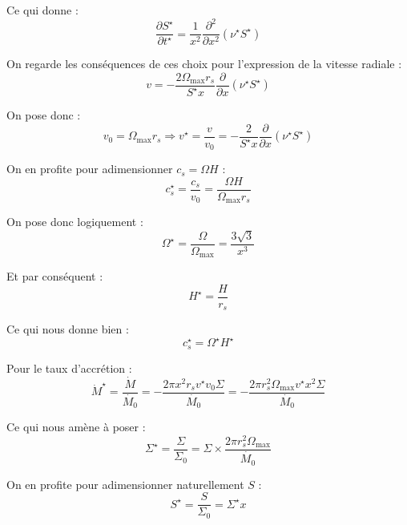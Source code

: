 Ce qui donne :
\begin{equation}
    \frac{\partial S^\star}{\partial t^\star} = \frac{1}{x^2} \frac{\partial^2}{\partial x^2} \left(\nu^\star S^\star\right)
\end{equation}

On regarde les conséquences de ces choix pour l’expression de la vitesse radiale :
\begin{equation}
    v = - \frac{2 \Omega_\mathrm{max} r_s}{S^\star x} \frac{\partial}{\partial x} \left(\nu^\star S^\star\right)
\end{equation}

On pose donc :
\begin{equation}
    v_0 = \Omega_\mathrm{max} r_s \Rightarrow v^\star = \frac{v}{v_0} = - \frac{2}{S^\star x} \frac{\partial}{\partial x} \left(\nu^\star S^\star\right)
\end{equation}

On en profite pour adimensionner $c_s = \Omega H$ :
\begin{equation}
    c_s^\star = \frac{c_s}{v_0} = \frac{\Omega H}{\Omega_\mathrm{max} r_s}
\end{equation}

On pose donc logiquement :
\begin{equation}
    \Omega^\star = \frac{\Omega}{\Omega_\mathrm{max}} = \frac{3\sqrt{3}}{x^3}
\end{equation}

Et par conséquent :
\begin{equation}
    H^\star = \frac{H}{r_s}
\end{equation}

Ce qui nous donne bien :
\begin{equation}
    c_s^\star = \Omega^\star H^\star
\end{equation}

Pour le taux d’accrétion :
\begin{equation}
    \dot{M}^\star = \frac{\dot{M}}{\dot{M_0}} = - \frac{2 \pi x^2 r_s v^\star v_0 \Sigma}{\dot{M_0}} = - \frac{2 \pi r_s^2 \Omega_\mathrm{max} v^\star x^2 \Sigma}{\dot{M_0}} 
\end{equation}

Ce qui nous amène à poser :
\begin{equation}
    \Sigma^\star = \frac{\Sigma}{\Sigma_0} = \Sigma × \frac{2 \pi r_s^2 \Omega_\mathrm{max}}{\dot{M_0}}
\end{equation}

On en profite pour adimensionner naturellement $S$ :
\begin{equation}
    S^\star = \frac{S}{\Sigma_0} = \Sigma^\star x
\end{equation}

